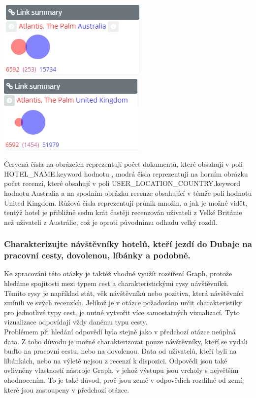 \documentclass[czech,BP]{thesiskiv}
\begin{document}
\begin{center}
	\includegraphics[scale=0.85]{img/AUS_atlantis.PNG}
	\hspace{0.4cm}
	\includegraphics[scale=0.85]{img/UK_atlantis.PNG}
\end{center}
 \noindent	
Červená čísla na obrázcích reprezentují počet dokumentů, které obsahují v poli HOTEL\_NAME.keyword hodnotu , modrá čísla reprezentují na horním obrázku počet recenzí, které obsahují v poli U\-SER\_LOCATION\_COUNTRY.keyword hodnotu Australia a na spodním obrázku recenze obsahující v témže poli hodnotu United Kingdom. Růžová čísla reprezentují průnik množin, a jak je možné vidět, tentýž hotel je přibližně sedm krát častěji recenzován uživateli z Velké Británie než uživateli z Austrálie, což je oproti původnímu odhadu velký rozdíl.

\subsubsection{Charakterizujte návštěvníky hotelů, kteří jezdí do Dubaje na pracovní cesty, dovolenou, líbánky a podobně.}
\label{subsub:Charakteristika návštěvníků}
Ke zpracování této otázky je taktéž vhodné využít rozšíření Graph, protože hledáme spojitosti mezi typem cest a charakteristickými rysy návštěvníků. Těmito rysy je například stát, věk návštěvníků nebo pozitiva, která návštěvníci zmínili ve svých recenzích. Jelikož je v otázce požadováno určit charakteristiky pro jednotlivé typy cest, je nutné vytvořit více samostatných vizualizací. Tyto vizualizace odpovídají vždy danému typu cesty.
\\
Problémem při hledání odpovědí byla stejně jako v předchozí otázce neúplná data. Z toho důvodu je možné charakterizovat pouze návštěvníky, kteří se vydali buďto na pracovní cestu, nebo na dovolenou. Data od uživatelů, kteří byli na líbánkách, nebo na výletě nejsou z recenzí k dispozici. Odpovědi jsou také ovlivněny vlastností nástroje Graph, v jehož výstupu jsou vrcholy s největším ohodnocením. To je také důvod, proč jsou země v odpovědích rozdílné od zemí, které jsou zastoupeny v předchozí otázce.
\end{document}
